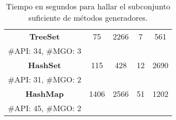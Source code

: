 \begin{table}[H]
\begin{tabular}{cccccc}
\multicolumn{2}{c}{\textbf{TreeSet}}        & 75     & 2266 & 7    & 561  \\
\multicolumn{2}{c}{\tiny \#API: 34, \#MGO: 3} & & & & \\

\multicolumn{2}{c}{\textbf{HashSet}}        & 115  & 428   & 12  & 2690 \\
\multicolumn{2}{c}{\tiny \#API: 31, \#MGO: 2} & & & & \\

\multicolumn{2}{c}{\textbf{HashMap}}        & 1406 & 2566 & 51   & 1202 \\
\multicolumn{2}{c}{\tiny \#API: 45, \#MGO: 2} & & & & \\
\hline
\end{tabular}

\caption{Tiempo en segundos para hallar el subconjunto suficiente de métodos generadores.}
\label{tab:eficiencia}
\end{table}
